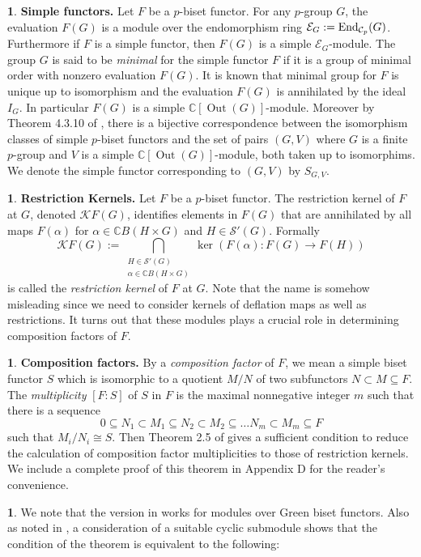 \documentclass[12pt]{article}
\theoremstyle{plain}
\theoremstyle{definition}
\newtheorem{nothing}[theorem]{}
\newcommand{\out}{\operatorname{Out}}
\begin{document}
\begin{nothing}{\bf Simple functors.}
    Let $F$ be a $p$-biset functor. For any $p$-group $G$, the evaluation $F(G)$ is a module over the endomorphism ring $\mathcal E_G:={\rm End}_{\mathcal C_p}(G)$. Furthermore if $F$ is a simple functor, then $F(G)$ is a simple $\mathcal E_G$-module. The group $G$ is said to be \emph{minimal} for the simple functor $F$ if it is a group of minimal order with nonzero evaluation $F(G)$. It is known that minimal group for $F$ is unique up to isomorphism and the evaluation $F(G)$ is annihilated by the ideal $I_G$. In particular $F(G)$ is a simple $\mathbb C[\out(G)]$-module. Moreover by Theorem 4.3.10 of \cite{Bouc}, there is a bijective correspondence between the isomorphism classes of simple $p$-biset functors and the set of pairs $(G, V)$ where $G$ is a finite $p$-group and $V$ is a simple $\mathbb C[\out(G)]$-module, both taken up to isomorphims. We denote the simple functor corresponding to $(G, V)$ by $S_{G, V}$.
\end{nothing}

\begin{nothing}{\bf Restriction Kernels.}
    Let $F$ be a $p$-biset functor. The restriction kernel of $F$ at $G$, denoted $\mathcal{K}F(G)$, identifies elements in $F(G)$ that are annihilated by all maps $F(\alpha)$ for $\alpha\in \mathbb CB(H\times G)$ and $H\in\mathcal{S}'(G)$. Formally
    \[
    \mathcal KF(G) := \bigcap_{\substack{H\in\mathcal{S}'(G)\\ \alpha\in\mathbb CB(H\times G)}} \ker(F(\alpha): F(G)\to F(H))
    \]
    is called the \textit{restriction kernel} of $F$ at $G$. Note that the name is somehow misleading since we need to consider kernels of deflation maps as well as restrictions. It turns out that these modules plays a crucial role in determining composition factors of $F$. 
\end{nothing}
\begin{nothing}{\bf Composition factors.}
    By a \emph{composition factor} of $F$, we mean a simple biset functor $S$ which is isomorphic to a quotient $M/N$ of two subfunctors $N\subset M\subseteq F$. The \emph{multiplicity} $[F:S]$ of $S$ in $F$ is the maximal nonnegative integer $m$ such that there is a sequence 
    \[
    0\subseteq N_1\subset M_1\subseteq N_2\subset M_2 \subseteq \ldots N_m\subset M_m\subseteq F
    \]
    such that $M_i/N_i\cong S$. Then Theorem 2.5 of  \cite{BCK} gives a sufficient condition to reduce the calculation of composition factor multiplicities to those of restriction kernels. We include a complete proof of this theorem in Appendix D for the reader’s convenience.
\end{nothing}
\begin{nothing}
    We note that the version in \cite{BCK} works for modules over Green biset functors. Also as noted in \cite[Proposition 2.6]{BCK}, a consideration of a suitable cyclic submodule shows that the condition of the theorem is equivalent to the following:
\end{nothing}
\end{document}
